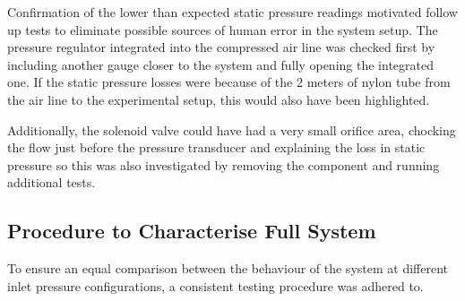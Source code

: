 Confirmation of the lower than expected static pressure readings motivated follow up tests to eliminate possible sources of human error in the system setup. The pressure regulator integrated into the compressed air line was checked first by including another gauge closer to the system and fully opening the integrated one. If the static pressure losses were because of the 2 meters of nylon tube from the air line to the experimental setup, this would also have been highlighted.

Additionally, the solenoid valve could have had a very small orifice area, chocking the flow just before the pressure transducer and explaining the loss in static pressure so this was also investigated by removing the component and running additional tests.

\subsection{Procedure to Characterise Full System}
To ensure an equal comparison between the behaviour of the system at different inlet pressure configurations, a consistent testing procedure was adhered to.

